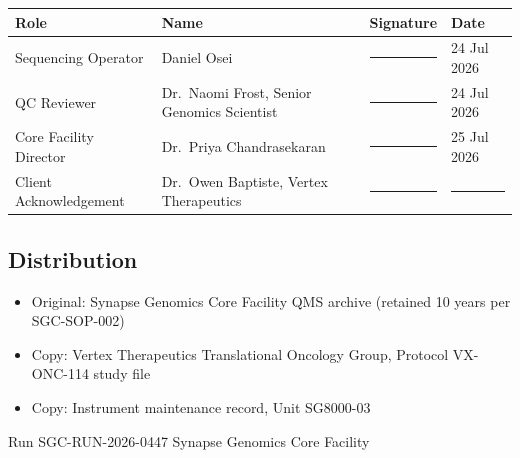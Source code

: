 \begin{tabularx}{\linewidth}{@{} L{2.9cm} L{6.0cm} C{2.3cm} C{2.0cm} @{}}
\toprule
{}
{\color{white}\bfseries Role} & {\color{white}\bfseries Name} & {\color{white}\bfseries Signature} & {\color{white}\bfseries Date} \\
\midrule
Sequencing Operator & Daniel Osei & \rule{2.1cm}{0.4pt} & 24 Jul 2026 \\
QC Reviewer          & Dr.\ Naomi Frost, Senior Genomics Scientist & \rule{2.1cm}{0.4pt} & 24 Jul 2026 \\
Core Facility Director & Dr.\ Priya Chandrasekaran & \rule{2.1cm}{0.4pt} & 25 Jul 2026 \\
Client Acknowledgement & Dr.\ Owen Baptiste, Vertex Therapeutics & \rule{2.1cm}{0.4pt} & \rule{1.6cm}{0.4pt} \\
\bottomrule
\end{tabularx}

\subsection{Distribution}

\begin{itemize}[leftmargin=1.4em, itemsep=2pt]
  \item Original: Synapse Genomics Core Facility QMS archive (retained 10 years per
  SGC-SOP-002)
  \item Copy: Vertex Therapeutics Translational Oncology Group, Protocol VX-ONC-114 study file
  \item Copy: Instrument maintenance record, Unit SG8000-03
\end{itemize}

\vspace{6pt}
\begin{center}
\color{SeqGray}\sffamily\footnotesize
{} \quad Run SGC-RUN-2026-0447 \quad Synapse Genomics Core Facility
\end{center}
